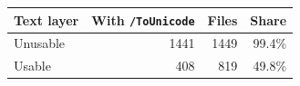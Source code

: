 \begin{tabular}{lrrr}
\toprule
Text layer & With \texttt{/ToUnicode} & Files & Share \\
\midrule
Unusable & 1441 & 1449 & 99.4\% \\
Usable & 408 & 819 & 49.8\% \\
\bottomrule
\end{tabular}
